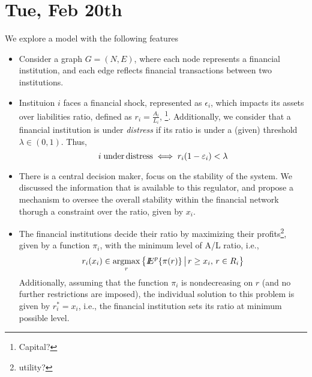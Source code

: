 \section{Tue, Feb 20th}
We explore a model with the following features
\begin{itemize}
\item[1.] Consider a graph $G=(N,E)$, where each node represents a financial institution, and each edge reflects financial transactions between two institutions. 

\item[2.] Instituion $i$ faces a financial shock, represented as $\epsilon_i$, which impacts its assets over liabilities ratio, defined as $r_i=\frac{A_i}{L_i}$, \footnote{Capital?}.  Additionally, we consider that a financial institution is under \emph{distress} if its ratio is under a (given) threshold $\lambda\in(0,1)$.  Thus,
\[i\;{\rm under\,distress}\iff r_i(1-\epsilon_i)<\lambda\]

\item[3.] There is a central decision maker, focus on the stability of the system.  We discussed the information that is available to this regulator, and propose a mechanism to oversee the overall stability within the financial network thorugh a constraint over the ratio, given by $x_i$.

\item[4.]  The financial institutions decide their ratio by maximizing their profits\footnote{utility?}, given by a function $\pi_i$, with the minimum level of A/L ratio, i.e.,
\[r_i(x_i)\in\argmax_r\lset \Ex^p\{ \pi(r)\}\mset r\geq x_i,\,r\in R_i\rset\]
Additionally, assuming that the function $\pi_i$ is nondecreasing on $r$ (and no further restrictions are imposed), the individual solution to this problem is given by $r_i^*=x_i$, i.e., the financial institution sets its ratio at minimum possible level.


\end{itemize}
